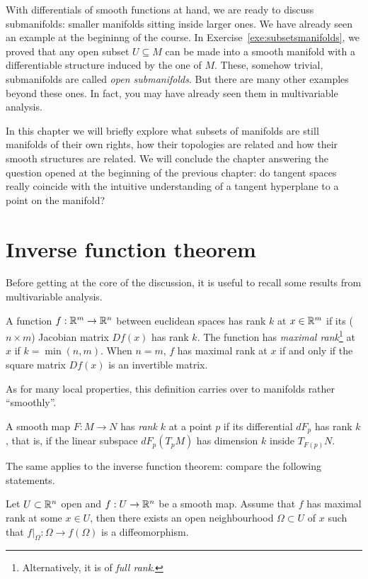 With differentials of smooth functions at hand, we are ready to discuss submanifolds: smaller manifolds sitting inside larger ones.
We have already seen an example at the begininng of the course.
In Exercise~\ref{exe:subsetsmanifolds}, we proved that any open subset $U\subseteq M$ can be made into a smooth manifold with a differentiable structure induced by the one of $M$.
These, somehow trivial, submanifolds are called \emph{open submanifolds}.
But there are many other examples beyond these ones.
In fact, you may have already seen them in multivariable analysis.

In this chapter we will briefly explore what subsets of manifolds are still manifolds of their own rights, how their topologies are related and how their smooth structures are related.
We will conclude the chapter answering the question opened at the beginning of the previous chapter: do tangent spaces really coincide with the intuitive understanding of a tangent hyperplane to a point on the manifold?

\section{Inverse function theorem}

Before getting at the core of the discussion, it is useful to
recall some results from multivariable analysis.

A function $f:\mathbb{R}^m \to \mathbb{R}^n$ between euclidean spaces has rank $k$ at $x\in\mathbb{R}^m$ if its ($n\times m$) Jacobian matrix $Df(x)$ has rank $k$.
The function has \emph{maximal rank}\footnote{Alternatively, it is of \emph{full rank}.} at $x$ if $k = \min(n,m)$.
When $n=m$, $f$ has maximal rank at $x$ if and only if the square matrix $Df(x)$ is an invertible matrix.

As for many local properties, this definition carries over to manifolds rather ``smoothly''.
%
\begin{definition}
    A smooth map $F:M\to N$ has \emph{rank $k$} at a point $p$ if its differential $dF_p$ has rank $k$, that is, if the linear subspace $dF_p(T_pM)$ has dimension $k$ inside $T_{F(p)}N$.
\end{definition}
%
The same applies to the inverse function theorem:
compare the following statements.
%
\begin{theorem}\label{thm:ift}
  Let $U\subset\mathbb{R}^n$ open and $f:U \to \mathbb{R}^n$ be a smooth map.
  Assume that $f$ has maximal rank at some $x\in U$, then there exists an open neighbourhood $\Omega\subset U$ of $x$ such that  $f\big|_\Omega : \Omega \to f(\Omega)$ is a diffeomorphism.
\end{theorem}

